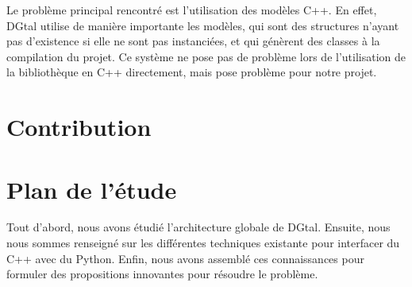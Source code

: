 \documentclass[11pt, french, screen]{report-rd-info}
\begin{document}
Le problème principal rencontré est l'utilisation des modèles C++. En effet, DGtal utilise de manière importante les modèles, qui sont des structures n'ayant pas d'existence si elle ne sont pas instanciées, et qui génèrent des classes à la compilation du projet.
Ce système ne pose pas de problème lors de l'utilisation de la bibliothèque en C++ directement, mais pose problème pour notre projet.

\section{Contribution}


\section{Plan de l'étude}

Tout d'abord, nous avons étudié l'architecture globale de DGtal. Ensuite, nous nous sommes renseigné sur les différentes techniques existante pour interfacer du C++ avec du Python. Enfin, nous avons assemblé ces connaissances pour formuler des propositions innovantes pour résoudre le problème.





\end{document}
